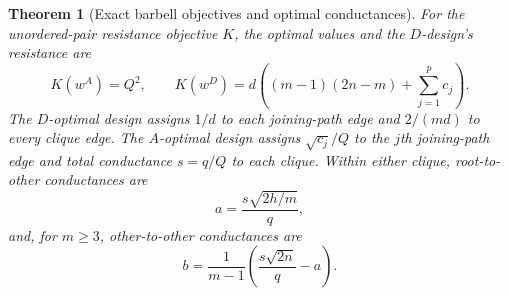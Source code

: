 \documentclass[11pt,a4paper]{article}
\newtheorem{theorem}{Theorem}[section]
\theoremstyle{definition}
\theoremstyle{remark}
\numberwithin{equation}{section}
\begin{document}
\begin{theorem}[Exact barbell objectives and optimal conductances]
\label{p3:thm:barbell-exact}
For the unordered-pair resistance objective $K$, the optimal values
and the $D$-design's resistance are
\begin{equation}\label{p3:eq:barbell-objectives}
 K(w^A)=Q^2,\qquad
 K(w^D)=d\left((m-1)(2n-m)+\sum_{j=1}^p c_j\right).
\end{equation}
The $D$-optimal design assigns $1/d$ to each joining-path edge and
$2/(md)$ to every clique edge.
The $A$-optimal design assigns $\sqrt{c_j}/Q$ to the $j$th joining-path
edge and total conductance $s=q/Q$ to each clique.
Within either clique, root-to-other conductances are
\[
 a=\frac{s\sqrt{2h/m}}q,
\]
and, for $m\geq3$, other-to-other conductances are
\[
 b=\frac1{m-1}
   \left(\frac{s\sqrt{2n}}q-a\right).
\]
\end{theorem}
\end{document}
